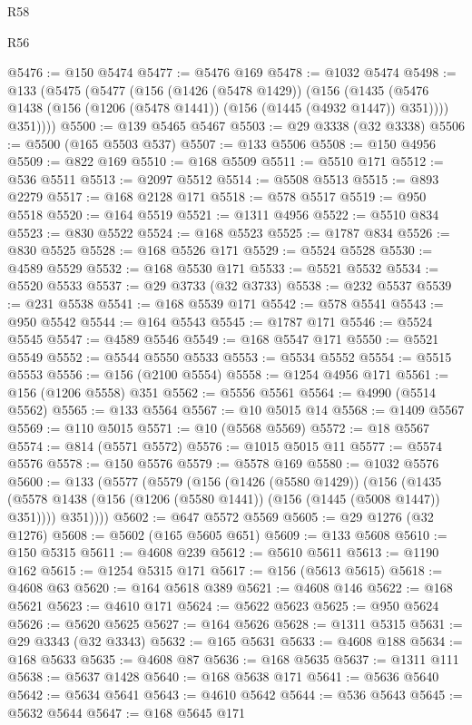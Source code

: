 \begin{lexlean}{R58}
\begin{lexlean}{R56}
\begin{coremodule}
{{{{{{{{{{{{{{{{{{{{{{{{{{{{{{{{{{{{{{{{{{{{{{{{{{{{{{{{{{{{{{{{{{{{{{{{{{{{{{{{{{{{{{{{{{{{{{{{{{{{{{{{{{{{{{{{{{{{{{{{{{{{{{{{{{{{{{{{{{{{{{{{{{{{{{{{{{{{{{{{{{{{{{{{{{{{{{{{{{{{{{{{{{{{{{{{{{{{{{{{{{{{{{{{{{{@5476 := @150 @5474
@5477 := @5476 @169
@5478 := @1032 @5474
@5498 := @133
    (@5475
      (@5477
        (@156
          (@1426 (@5478 @1429))
          (@156
            (@1435 (@5476 @1438 (@156 (@1206 (@5478 @1441)) (@156 (@1445 (@4932 @1447)) @351))))
            @351))))
@5500 := @139 @5465 @5467
@5503 := @29 @3338 (@32 @3338)
@5506 := @5500 (@165 @5503 @537)
@5507 := @133 @5506
@5508 := @150 @4956
@5509 := @822 @169
@5510 := @168 @5509
@5511 := @5510 @171
@5512 := @536 @5511
@5513 := @2097 @5512
@5514 := @5508 @5513
@5515 := @893 @2279
@5517 := @168 @2128 @171
@5518 := @578 @5517
@5519 := @950 @5518
@5520 := @164 @5519
@5521 := @1311 @4956
@5522 := @5510 @834
@5523 := @830 @5522
@5524 := @168 @5523
@5525 := @1787 @834
@5526 := @830 @5525
@5528 := @168 @5526 @171
@5529 := @5524 @5528
@5530 := @4589 @5529
@5532 := @168 @5530 @171
@5533 := @5521 @5532
@5534 := @5520 @5533
@5537 := @29 @3733 (@32 @3733)
@5538 := @232 @5537
@5539 := @231 @5538
@5541 := @168 @5539 @171
@5542 := @578 @5541
@5543 := @950 @5542
@5544 := @164 @5543
@5545 := @1787 @171
@5546 := @5524 @5545
@5547 := @4589 @5546
@5549 := @168 @5547 @171
@5550 := @5521 @5549
@5552 := @5544 @5550 @5533
@5553 := @5534 @5552
@5554 := @5515 @5553
@5556 := @156 (@2100 @5554)
@5558 := @1254 @4956 @171
@5561 := @156 (@1206 @5558) @351
@5562 := @5556 @5561
@5564 := @4990 (@5514 @5562)
@5565 := @133 @5564
@5567 := @10 @5015 @14
@5568 := @1409 @5567
@5569 := @110 @5015
@5571 := @10 (@5568 @5569)
@5572 := @18 @5567
@5574 := @814 (@5571 @5572)
@5576 := @1015 @5015 @11
@5577 := @5574 @5576
@5578 := @150 @5576
@5579 := @5578 @169
@5580 := @1032 @5576
@5600 := @133
    (@5577
      (@5579
        (@156
          (@1426 (@5580 @1429))
          (@156
            (@1435 (@5578 @1438 (@156 (@1206 (@5580 @1441)) (@156 (@1445 (@5008 @1447)) @351))))
            @351))))
@5602 := @647 @5572 @5569
@5605 := @29 @1276 (@32 @1276)
@5608 := @5602 (@165 @5605 @651)
@5609 := @133 @5608
@5610 := @150 @5315
@5611 := @4608 @239
@5612 := @5610 @5611
@5613 := @1190 @162
@5615 := @1254 @5315 @171
@5617 := @156 (@5613 @5615)
@5618 := @4608 @63
@5620 := @164 @5618 @389
@5621 := @4608 @146
@5622 := @168 @5621
@5623 := @4610 @171
@5624 := @5622 @5623
@5625 := @950 @5624
@5626 := @5620 @5625
@5627 := @164 @5626
@5628 := @1311 @5315
@5631 := @29 @3343 (@32 @3343)
@5632 := @165 @5631
@5633 := @4608 @188
@5634 := @168 @5633
@5635 := @4608 @87
@5636 := @168 @5635
@5637 := @1311 @111
@5638 := @5637 @1428
@5640 := @168 @5638 @171
@5641 := @5636 @5640
@5642 := @5634 @5641
@5643 := @4610 @5642
@5644 := @536 @5643
@5645 := @5632 @5644
@5647 := @168 @5645 @171
}}}}}}}}}}}}}}}}}}}}}}}}}}}}}}}}}}}}}}}}}}}}}}}}}}}}}}}}}}}}}}}}}}}}}}}}}}}}}}}}}}}}}}}}}}}}}}}}}}}}}}}}}}}}}}}}}}}}}}}}}}}}}}}}}}}}}}}}}}}}}}}}}}}}}}}}}}}}}}}}}}}}}}}}}}}}}}}}}}}}}}}}}}}}}}}}}}}}}}}}}}}}}}}}}}}
\end{coremodule}
\end{lexlean}
\end{lexlean}

